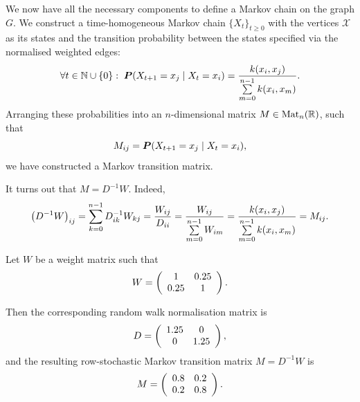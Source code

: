 We now have all the necessary components to define a Markov chain on the graph $G$. We construct a time-homogeneous Markov chain $\{X_t\}_{t\geq0}$ with the vertices $\mathcal{X}$ as its states and the transition probability between the states specified via the normalised weighted edges:
\begin{gather*}
    \forall t\in\mathbb{N}\cup\{0\}:\; \boldsymbol{P}(X_{t+1}=x_j\mid X_t = x_i) = \frac{k(x_i,x_j)}{\sum\limits_{m=0}^{n-1}k(x_i,x_m)}.
\end{gather*}
Arranging these probabilities into an $n$-dimensional matrix $M\in\text{Mat}_n(\mathbb{R})$, such that $$M_{ij}=\boldsymbol{P}(X_{t+1}=x_j\mid X_t = x_i),$$ we have constructed a Markov transition matrix.

It turns out that $M=D^{-1}W$. Indeed, 
\begin{gather*}
    \left( D^{-1}W\right)_{ij} = \sum\limits_{k=0}^{n-1}D_{ik}^{-1}W_{kj}=\frac{W_{ij}}{D_{ii}}=\frac{W_{ij}}{\sum\limits_{m=0}^{n-1}W_{im}}=\frac{k(x_i,x_j)}{\sum\limits_{m=0}^{n-1}k(x_i,x_m)}=M_{ij}.
\end{gather*}

\begin{ex}
    Let $W$ be a weight matrix such that
    \begin{align*}
    W =
        \left(
        \begin{array}{c c}
        1 & 0.25 \\
        0.25 & 1
        \end{array}
        \right).
    \end{align*}

    Then the corresponding random walk normalisation matrix is
    \begin{align*}
    D =
        \left(
        \begin{array}{c c}
        1.25 & 0 \\
        0 & 1.25
        \end{array}
        \right),
    \end{align*}
    and the resulting row-stochastic Markov transition matrix $M=D^{-1}W$ is
    \begin{align*}
    M =
        \left(
        \begin{array}{c c}
        0.8 & 0.2 \\
        0.2 & 0.8
        \end{array}
        \right).
    \end{align*}
\end{ex}

